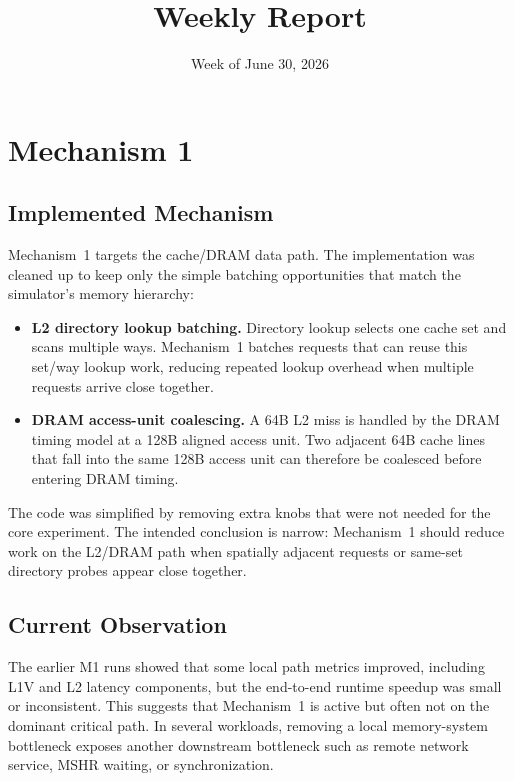 \documentclass[sigconf,screen,review]{acmart}
\title{Weekly Report}
\subtitle{Week of June 30, 2026}
\begin{document}
\maketitle

\section{Mechanism 1}

\subsection{Implemented Mechanism}

Mechanism~1 targets the cache/DRAM data path.  The implementation was cleaned
up to keep only the simple batching opportunities that match the simulator's
memory hierarchy:

\begin{itemize}
  \item \textbf{L2 directory lookup batching.}  Directory lookup selects one
  cache set and scans multiple ways.  Mechanism~1 batches requests that can
  reuse this set/way lookup work, reducing repeated lookup overhead when
  multiple requests arrive close together.
  \item \textbf{DRAM access-unit coalescing.}  A 64B L2 miss is handled by the
  DRAM timing model at a 128B aligned access unit.  Two adjacent 64B cache
  lines that fall into the same 128B access unit can therefore be coalesced
  before entering DRAM timing.
\end{itemize}

The code was simplified by removing extra knobs that were not needed for the
core experiment.  The intended conclusion is narrow: Mechanism~1 should reduce
work on the L2/DRAM path when spatially adjacent requests or same-set
directory probes appear close together.

\subsection{Current Observation}

The earlier M1 runs showed that some local path metrics improved, including
L1V and L2 latency components, but the end-to-end runtime speedup was small or
inconsistent.  This suggests that Mechanism~1 is active but often not on the
dominant critical path.  In several workloads, removing a local memory-system
bottleneck exposes another downstream bottleneck such as remote network
service, MSHR waiting, or synchronization.
\end{document}
